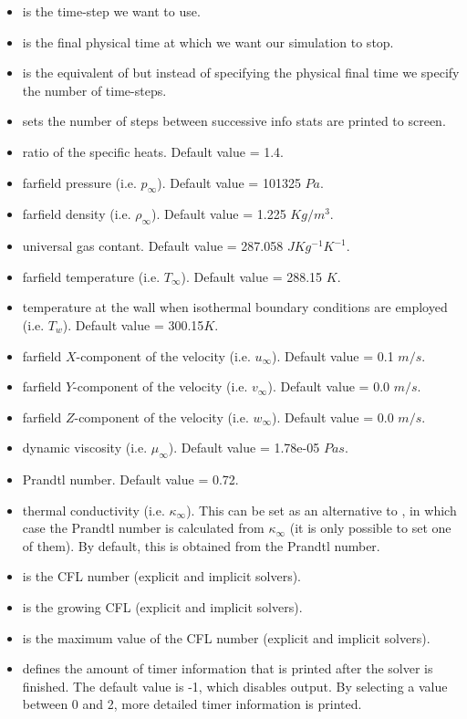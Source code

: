 \begin{itemize}
\item {} is the time-step we want to use.
\item {} is the final physical time at which we want our simulation to stop.
\item {} is the equivalent of  but instead of specifying the
physical final time we specify the number of time-steps.
\item {} sets the number of steps between successive info stats are printed
to screen.
\item {} ratio of the specific heats. Default value = 1.4.
\item {} farfield pressure (i.e. $p_{\infty}$). Default value = 101325 $Pa$.
\item {} farfield density (i.e. $\rho_{\infty}$). Default value = 1.225 $Kg/m^{3}$.
\item {} universal gas contant. Default value = 287.058 $JKg^{-1}K^{-1}$.
\item {} farfield temperature (i.e. $T_{\infty}$). Default value = 288.15 $K$.
\item {} temperature at the wall when isothermal boundary
conditions are employed (i.e. $T_{w}$). Default value = 300.15$K$.
\item {} farfield $X$-component of the velocity (i.e. $u_{\infty}$). Default value = 0.1 $m/s$.
\item {} farfield $Y$-component of the velocity (i.e. $v_{\infty}$). Default value = 0.0 $m/s$.
\item {} farfield $Z$-component of the velocity (i.e. $w_{\infty}$). Default value = 0.0 $m/s$.
\item {} dynamic viscosity (i.e. $\mu_{\infty}$). Default value = 1.78e-05 $Pa s$.
\item {} Prandtl number. Default value = 0.72.
\item {} thermal conductivity (i.e. $\kappa_{\infty}$). This can be set as an
 alternative to , in which case the Prandtl number is calculated from $\kappa_{\infty}$
 (it is only possible to set one of them). By default, this is obtained from the Prandtl number.
\item {} is the CFL number (explicit and implicit solvers).
\item {} is the growing CFL (explicit and implicit solvers).
\item {} is the maximum value of the CFL number (explicit and implicit solvers).
\item {} defines the amount of timer information that is printed after the solver is finished.
      The default value is -1, which disables output. By selecting a value between 0 and 2, more detailed timer
      information is printed.
\end{itemize}

